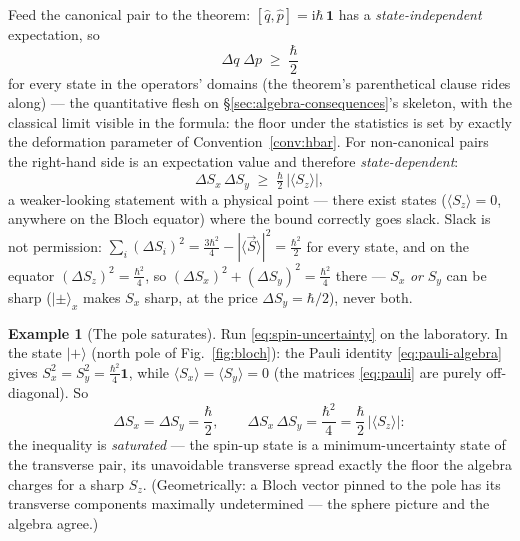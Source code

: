 \documentclass[11pt]{article}
\theoremstyle{plain}
\theoremstyle{definition}
\newtheorem{example}[theorem]{Example}
\theoremstyle{remark}
\newcommand{\ii}{\mathrm{i}}
\newcommand{\op}[1]{\hat{#1}}
\newcommand{\idop}{\mathbf{1}}  %
\newcommand{\ket}[1]{\lvert #1 \rangle}
\begin{document}
\noindent
Feed the canonical pair to the theorem: $[\op q, \op p] =
\ii\hbar\,\idop$ has a \emph{state-independent} expectation, so
\begin{equation}
  \boxed{\;
  \Delta q\;\Delta p \;\ge\; \frac{\hbar}{2}
  \;}
  \label{eq:heisenberg}
\end{equation}
for every state in the operators' domains (the theorem's
parenthetical clause rides along) --- the quantitative flesh on
\S\ref{sec:algebra-consequences}'s skeleton, with the classical
limit visible in the formula: the floor under the statistics is set
by exactly the deformation parameter of
Convention~\ref{conv:hbar}. For non-canonical pairs the right-hand
side is an expectation value and therefore \emph{state-dependent}:
\begin{equation}
  \Delta S_x\,\Delta S_y \;\ge\; \tfrac\hbar2\,
  \bigl|\langle S_z\rangle\bigr| ,
  \label{eq:spin-uncertainty}
\end{equation}
a weaker-looking statement with a physical point --- there exist
states ($\langle S_z\rangle = 0$, anywhere on the Bloch equator)
where the bound correctly goes slack. Slack is not permission:
$\sum_i (\Delta S_i)^2 = \tfrac{3\hbar^2}{4} - |\langle\vec S\rangle|^2
= \tfrac{\hbar^2}{2}$ for every state, and on the equator
$(\Delta S_z)^2 = \tfrac{\hbar^2}{4}$, so
$(\Delta S_x)^2 + (\Delta S_y)^2 = \tfrac{\hbar^2}{4}$ there ---
$S_x$ \emph{or} $S_y$ can be sharp ($\ket\pm_x$ makes $S_x$ sharp,
at the price $\Delta S_y = \hbar/2$), never both.

\begin{example}[The pole saturates]\label{ex:spin-saturation}
Run \eqref{eq:spin-uncertainty} on the laboratory. In the state
$\ket+$ (north pole of Fig.~\ref{fig:bloch}): the Pauli identity
\eqref{eq:pauli-algebra} gives $S_x^2 = S_y^2 = \tfrac{\hbar^2}4
\idop$, while $\langle S_x\rangle = \langle S_y\rangle = 0$ (the
matrices \eqref{eq:pauli} are purely off-diagonal). So
\begin{equation}
  \Delta S_x = \Delta S_y = \frac\hbar2,
  \qquad
  \Delta S_x\,\Delta S_y = \frac{\hbar^2}{4}
  = \frac\hbar2\,\bigl|\langle S_z\rangle\bigr| :
\end{equation}
the inequality is \emph{saturated} --- the spin-up state is a
minimum-uncertainty state of the transverse pair, its unavoidable
transverse spread exactly the floor the algebra charges for a sharp
$S_z$. (Geometrically: a Bloch vector pinned to the pole has its
transverse components maximally undetermined --- the sphere picture
and the algebra agree.)
\end{example}
\end{document}
